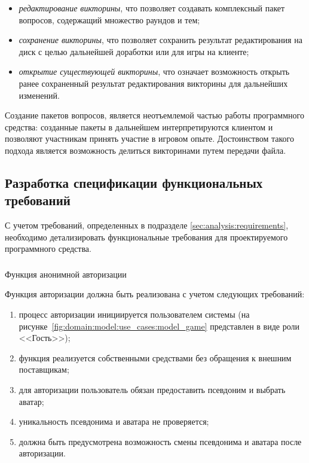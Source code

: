 \begin{itemize}
	\item \emph{редактирование викторины}, что позволяет создавать комплексный пакет вопросов, содержащий множество раундов и тем;
	\item \emph{сохранение викторины}, что позволяет сохранить результат редактирования на диск с целью дальнейшей доработки или для игры на клиенте;
	\item \emph{открытие существующей викторины}, что означает возможность открыть ранее сохраненный результат редактирования викторины для дальнейших изменений.
\end{itemize}

Создание пакетов вопросов, является неотъемлемой частью работы программного средства: созданные пакеты в дальнейшем интерпретируются клиентом и позволяют участникам принять
участие в игровом опыте. Достоинством такого подхода является возможность делиться викторинами путем передачи файла.

\subsection{Разработка спецификации функциональных требований}
\label{sec:domain:specification}

С учетом требований, определенных в подразделе \ref{sec:analysis:requirements}, необходимо детализировать функциональные требования для проектируемого программного средства.

\subsubsection{} Функция анонимной авторизации
\label{sec:domain:specification:signin}

Функция авторизации должна быть реализована с учетом следующих требований:

\begin{enumerate}
	\item процесс авторизации инициируется пользователем системы (на рисунке~\ref{fig:domain:model:use_cases:model_game} представлен в виде роли <<Гость>>);
	\item функция реализуется собственными средствами без обращения к вне\-ш\-ним поставщикам;
	\item для авторизации пользователь обязан предоставить псевдоним и выбрать аватар;
	\item уникальность псевдонима и аватара не проверяется;
	\item должна быть предусмотрена возможность смены псевдонима и аватара после авторизации.
\end{enumerate}


